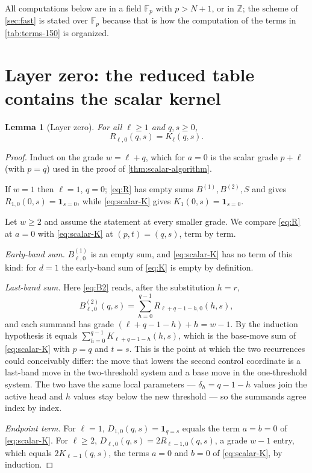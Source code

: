 \documentclass[11pt,reqno]{amsart}
\newtheorem{lemma}[theorem]{Lemma}
\theoremstyle{definition}
\theoremstyle{remark}
\newcommand{\one}{\mathbf 1}
\begin{document}
All computations below are in a field $\mathbb F_p$ with $p>N+1$, or in
$\mathbb Z$; the scheme of \cref{sec:fast} is stated over $\mathbb F_p$
because that is how the computation of the terms in
\cref{tab:terms-150} is organized.

\section{Layer zero: the reduced table contains the scalar kernel}
\label{sec:layer0}

\begin{lemma}[Layer zero]\label{lem:layer-zero}
For all $\ell\geq1$ and $q,s\geq0$,
\[
 R_{\ell,0}(q,s)=K_\ell(q,s).
\]
\end{lemma}

\begin{proof}
Induct on the grade $w=\ell+q$, which for $a=0$ is the scalar grade $p+\ell$
(with $p=q$) used in the proof of \cref{thm:scalar-algorithm}.

If $w=1$ then $\ell=1$, $q=0$; \eqref{eq:R} has empty sums
$B^{(1)},B^{(2)},S$ and gives $R_{1,0}(0,s)=\one_{s=0}$, while
\eqref{eq:scalar-K} gives
$K_1(0,s)=\one_{s=0}$.

Let $w\geq2$ and assume the statement at every smaller grade.  We compare
\eqref{eq:R} at $a=0$ with \eqref{eq:scalar-K} at $(p,t)=(q,s)$, term by
term.

\emph{Early-band sum.}  $B^{(1)}_{\ell,0}$ is an empty sum, and
\eqref{eq:scalar-K} has no term of this kind: for $d=1$ the early-band sum
of \eqref{eq:K} is empty by definition.

\emph{Last-band sum.}  Here \eqref{eq:B2} reads, after the substitution
$h=r$,
\[
 B^{(2)}_{\ell,0}(q,s)=\sum_{h=0}^{q-1}R_{\ell+q-1-h,0}(h,s),
\]
and each summand has grade
$(\ell+q-1-h)+h=w-1$.  By the induction hypothesis it equals
$\sum_{h=0}^{q-1}K_{\ell+q-1-h}(h,s)$, which is the base-move sum of
\eqref{eq:scalar-K} with $p=q$ and $t=s$.  This is the point at which the
two recurrences could conceivably differ: the move that lowers the second
control coordinate is a last-band move in the two-threshold system and a
base move in the one-threshold system.  The two have the same local
parameters --- $\delta_h=q-1-h$ values join the active head and $h$ values
stay below the new threshold --- so the summands agree index by index.

\emph{Endpoint term.}  For $\ell=1$, $D_{1,0}(q,s)=\one_{q=s}$ equals
the term $a=b=0$ of \eqref{eq:scalar-K}.  For $\ell\geq2$,
$D_{\ell,0}(q,s)=2R_{\ell-1,0}(q,s)$, a grade $w-1$ entry, which equals
$2K_{\ell-1}(q,s)$, the terms $a=0$ and $b=0$ of \eqref{eq:scalar-K}, by
induction.


\end{proof}
\end{document}
